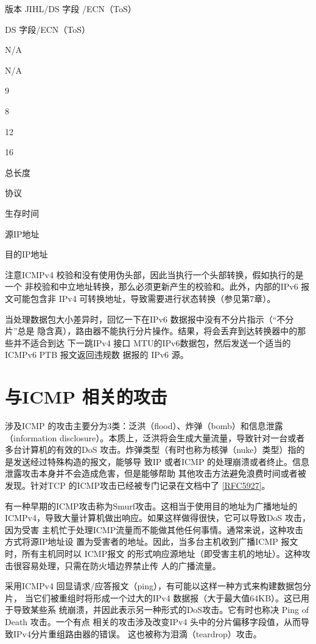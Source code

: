 版本 JIHL/DS 字段 /ECN（ToS）

DS 字段/ECN（ToS）

N/A

N/A

9

8

12

16

总长度

协议

生存时间

源IP地址

目的IP地址

注意ICMPv4 校验和没有使用伪头部，因此当执行一个头部转换，假如执行的是一个
非校验和中立地址转换，那么必须更新产生的校验和。此外，内部的IPv6 报文可能包含非
IPv4 可转换地址，导致需要进行状态转换（参见第7章）。

当处理数据包大小差异时，回忆一下在IPv6 数据报中没有不分片指示（“不分片”总是
隐含真），路由器不能执行分片操作。结果，将会丢弃到达转换器中的那些并不适合到达
下一跳IPv4 接口 MTU的IPv6数据包，然后发送一个适当的ICMPv6 PTB 报文返回违规数
据报的 IPv6 源。

\section{与ICMP 相关的攻击}

涉及ICMP 的攻击主要分为3类：泛洪（flood）、炸弹（bomb）和信息泄露 （information
disclosure）。本质上，泛洪将会生成大量流量，导致针对一台或者多台计算机的有效的DoS
攻击。炸弹类型（有时也称为核弹（nuke）类型）指的是发送经过特殊构造的报文，能够导
致IP 或者ICMP 的处理崩溃或者终止。信息泄露攻击本身并不会造成危害，但是能够帮助
其他攻击方法避免浪费时间或者被发现。针对TCP 的ICMP攻击已经被专门记录在文档中了
\href{https://www.rfc-editor.org/rfc/rfc5927}{[RFC5927]}。

有一种早期的ICMP攻击称为Smurf攻击。这相当于使用目的地址为广播地址的
ICMPv4，导致大量计算机做出响应。如果这样做得很快，它可以导致DoS 攻击，因为受害
主机忙于处理ICMP流量而不能做其他任何事情。通常来说，这种攻击方式将源IP地址设
置为受害者的地址。因此，当多台主机收到广播ICMP 报文时，所有主机同时以 ICMP报文
的形式响应源地址（即受害主机的地址）。这种攻击很容易处理，只需在防火墙边界禁止传
人的广播流量。

采用ICMPv4 回显请求/应答报文（ping），有可能以这样一种方式来构建数据包分片，
当它们被重组时将形成一个过大的IPv4 数据报（大于最大值64KB）。这已用于导致某些系
统崩溃，并因此表示另一种形式的DoS攻击。它有时也称决 Ping of Death 攻击。一个有点
相关的攻击涉及改变IPv4 头中的分片偏移字段值，从而导致IPv4分片重组路由器的错误。
这也被称为泪滴（teardrop）攻击。

